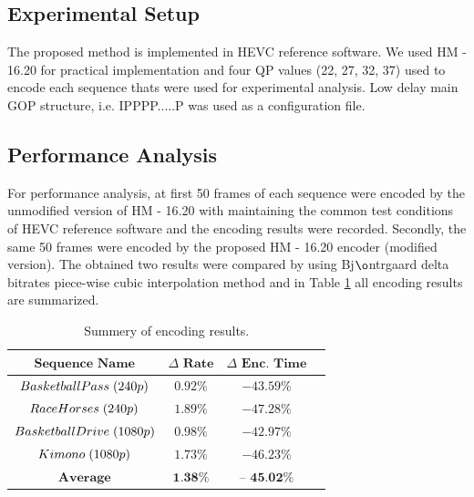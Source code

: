 \documentclass{article}
\begin{document}
 
\subsection{Experimental Setup}
\label{subsec:Experimental Setup}
The proposed method is implemented in HEVC reference software. We used HM - 16.20 \cite{HM} for practical implementation and four QP values (22, 27, 32, 37) used to encode each sequence thats were used for experimental analysis. Low delay main GOP structure, i.e. IPPPP.....P was used as a configuration file.


\subsection{Performance Analysis}
\label{subsec:Performance Analysis}

For performance analysis, at first 50 frames of each sequence were encoded by the unmodified version of HM - 16.20 with maintaining the common test conditions of HEVC reference software \cite{bossen2013common} and the encoding results were recorded. Secondly, the same 50 frames were encoded by the proposed  HM - 16.20 encoder (modified version). The obtained two results were compared by using Bj$\o$ntrgaard delta bitrates piece-wise cubic interpolation method \cite{bjontegaard2001calculation} and in Table \ref{tab:BD Results} all encoding results are summarized.

\begin{table}[h]
	\centering
	\vspace{-2.5mm}
	\caption{Summery of encoding results.}
	\vspace{1.2mm}
	\renewcommand{\arraystretch}{1.2}
	\begin{tabular}{ |c|c|c|c| }
		\hline $\textbf{Sequence Name}$ & $\textbf{$\Delta$ Rate}$  & $\textbf{$\Delta$ Enc. Time}$ \\
		\hline $BasketballPass \hspace{.1cm} (240p)$ & $0.92\%$ & $- 43.59 \%$ \\
		\hline $RaceHorses \hspace{.1cm} (240p)$ & $1.89\%$ & $- 47.28 \%$ \\
		\hline $BasketballDrive \hspace{.1cm} (1080p)$ & $0.98\%$ & $- 42.97\%$ \\
		\hline $Kimono \hspace{.1cm} (1080p)$ & $1.73\%$ & $- 46.23\%$ \\
		\hline $\textbf{Average}$ & $\textbf{1.38\%}$ & $\textbf{-- 45.02\%}$ \\
		\hline
	\end{tabular}
	\renewcommand{\arraystretch}{1.2}
	\vspace{-6.5mm}
	\label{tab:BD Results}
\end{table}
\end{document}

